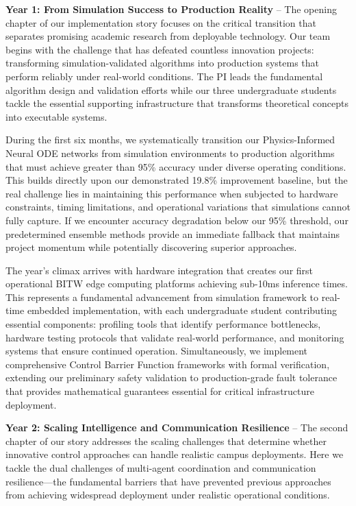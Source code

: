 \documentclass[12pt]{article}
\begin{document}
\textbf{Year 1: From Simulation Success to Production Reality} – The opening chapter of our implementation story focuses on the critical transition that separates promising academic research from deployable technology. Our team begins with the challenge that has defeated countless innovation projects: transforming simulation-validated algorithms into production systems that perform reliably under real-world conditions. The PI leads the fundamental algorithm design and validation efforts while our three undergraduate students tackle the essential supporting infrastructure that transforms theoretical concepts into executable systems.

During the first six months, we systematically transition our Physics-Informed Neural ODE networks from simulation environments to production algorithms that must achieve greater than 95\% accuracy under diverse operating conditions. This builds directly upon our demonstrated 19.8\% improvement baseline, but the real challenge lies in maintaining this performance when subjected to hardware constraints, timing limitations, and operational variations that simulations cannot fully capture. If we encounter accuracy degradation below our 95\% threshold, our predetermined ensemble methods provide an immediate fallback that maintains project momentum while potentially discovering superior approaches.

The year's climax arrives with hardware integration that creates our first operational BITW edge computing platforms achieving sub-10ms inference times. This represents a fundamental advancement from simulation framework to real-time embedded implementation, with each undergraduate student contributing essential components: profiling tools that identify performance bottlenecks, hardware testing protocols that validate real-world performance, and monitoring systems that ensure continued operation. Simultaneously, we implement comprehensive Control Barrier Function frameworks with formal verification, extending our preliminary safety validation to production-grade fault tolerance that provides mathematical guarantees essential for critical infrastructure deployment.

\textbf{Year 2: Scaling Intelligence and Communication Resilience} – The second chapter of our story addresses the scaling challenges that determine whether innovative control approaches can handle realistic campus deployments. Here we tackle the dual challenges of multi-agent coordination and communication resilience—the fundamental barriers that have prevented previous approaches from achieving widespread deployment under realistic operational conditions.
\end{document}
